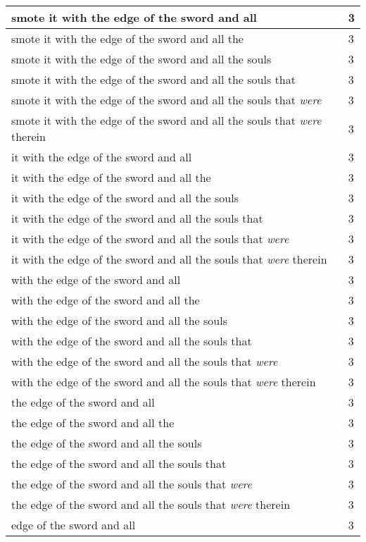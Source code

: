 \begin{center}
\begin{longtable}{|p{3.0in}|p{0.5in}|}
smote it with the edge of the sword and all & 3\\ \hline 
smote it with the edge of the sword and all the & 3\\ \hline 
smote it with the edge of the sword and all the souls & 3\\ \hline 
smote it with the edge of the sword and all the souls that & 3\\ \hline 
smote it with the edge of the sword and all the souls that \emph{were} & 3\\ \hline 
smote it with the edge of the sword and all the souls that \emph{were} therein & 3\\ \hline 
it with the edge of the sword and all & 3\\ \hline 
it with the edge of the sword and all the & 3\\ \hline 
it with the edge of the sword and all the souls & 3\\ \hline 
it with the edge of the sword and all the souls that & 3\\ \hline 
it with the edge of the sword and all the souls that \emph{were} & 3\\ \hline 
it with the edge of the sword and all the souls that \emph{were} therein & 3\\ \hline 
with the edge of the sword and all & 3\\ \hline 
with the edge of the sword and all the & 3\\ \hline 
with the edge of the sword and all the souls & 3\\ \hline 
with the edge of the sword and all the souls that & 3\\ \hline 
with the edge of the sword and all the souls that \emph{were} & 3\\ \hline 
with the edge of the sword and all the souls that \emph{were} therein & 3\\ \hline 
the edge of the sword and all & 3\\ \hline 
the edge of the sword and all the & 3\\ \hline 
the edge of the sword and all the souls & 3\\ \hline 
the edge of the sword and all the souls that & 3\\ \hline 
the edge of the sword and all the souls that \emph{were} & 3\\ \hline 
the edge of the sword and all the souls that \emph{were} therein & 3\\ \hline 
edge of the sword and all & 3\\ \hline 

\end{longtable}
\end{center}
